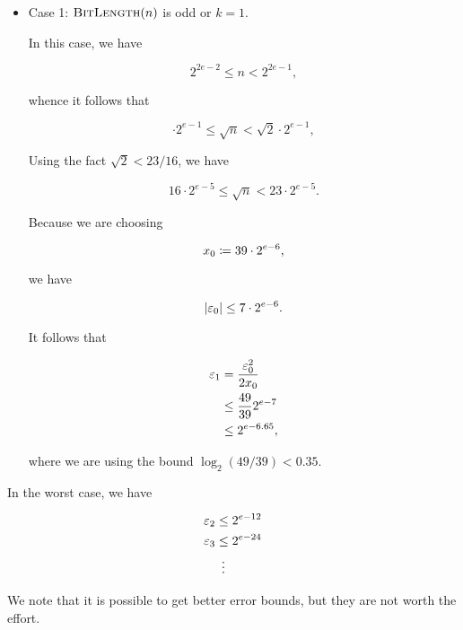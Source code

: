 \begin{itemize}
\item Case 1: $\textsc{BitLength}(n)$ is odd or $k=1$.

In this case, we have

\begin{equation}
    2^{2e-2} \le n < 2^{2e-1},
\end{equation}

\noindent
whence it follows that

\begin{equation}
    \cdot2^{e-1} \le \sqrt{n} < \sqrt{2}\cdot2^{e-1},
\end{equation}

\noindent
Using the fact $\sqrt{2} < 23/16$, we have

\begin{equation}
    16\cdot2^{e-5} \le \sqrt{n} < 23\cdot2^{e-5}.
\end{equation}

\noindent
Because we are choosing

\begin{equation}
    x_{0} \coloneqq{} 39\cdot2^{e-6},
\end{equation}

\noindent
we have

\begin{equation}
    \left| \varepsilon_{0} \right| \le 7\cdot2^{e-6}.
\end{equation}

It follows that

\begin{align}
    \varepsilon_{1} &= \frac{\varepsilon_{0}^{2}}{2x_{0}} \nonumber\\
        &\le \frac{49}{39}2^{e-7} \nonumber\\
        &\le 2^{e-6.65},
\end{align}

\noindent
where we are using the bound $\log_{2}(49/39) < 0.35$.
\end{itemize}

In the worst case, we have

\begin{align}
    \varepsilon_{2} &\le 2^{e-12} \nonumber\\
    \varepsilon_{3} &\le 2^{e-24} \nonumber\\
        &\ \vdots
\end{align}

\noindent
We note that it is possible to get better error bounds,
but they are not worth the effort.


\subsubsection{\Linear{}}
\label{app:error_bounds:linear}

